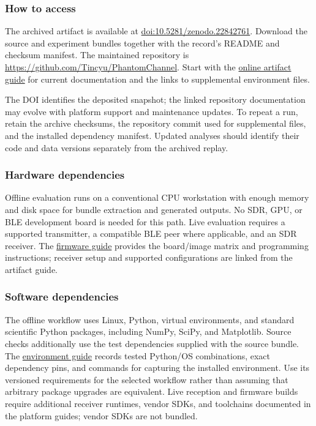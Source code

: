 \documentclass[nonacm,sigconf]{acmart}
\newcommand{\artifactguide}{\href{https://github.com/Tincyu/PhantomChannel/blob/main/docs/artifact-guide.md}{online artifact guide}}
\newcommand{\envguide}{\href{https://github.com/Tincyu/PhantomChannel/blob/main/reproduction/ENVIRONMENT.md}{environment guide}}
\newcommand{\firmwareguide}{\href{https://github.com/Tincyu/PhantomChannel/blob/main/firmware/images/FIRMWARE_GUIDE.md}{firmware guide}}
\begin{document}
\subsubsection{How to access}
The archived artifact is available at
\href{https://doi.org/10.5281/zenodo.22842761}{doi:10.5281/\allowbreak zenodo.22842761}.
Download the source and experiment bundles together with the record's README
and checksum manifest. The maintained repository is
\url{https://github.com/Tincyu/PhantomChannel}.
Start with the \artifactguide{} for current documentation and the links to
supplemental environment files.

The DOI identifies the deposited snapshot; the linked repository documentation
may evolve with platform support and maintenance updates. To repeat a run,
retain the archive checksums, the repository commit used for supplemental
files, and the installed dependency manifest. Updated analyses should identify
their code and data versions separately from the archived replay.

\subsubsection{Hardware dependencies}
Offline evaluation runs on a conventional CPU workstation with enough memory
and disk space for bundle extraction and generated outputs. No SDR, GPU, or
BLE development board is needed for this path. Live evaluation requires a
supported transmitter, a compatible BLE peer where applicable, and an SDR
receiver. The \firmwareguide{} provides the board/image matrix and programming
instructions; receiver setup and supported configurations are linked from the
artifact guide.

\subsubsection{Software dependencies}
The offline workflow uses Linux, Python, virtual environments, and standard
scientific Python packages, including NumPy, SciPy, and Matplotlib. Source
checks additionally use the test dependencies supplied with the source bundle.
The \envguide{} records tested Python/OS combinations, exact dependency pins,
and commands for capturing the installed environment. Use its versioned
requirements for the selected workflow rather than assuming that arbitrary
package upgrades are equivalent. Live reception and firmware builds require
additional receiver runtimes, vendor SDKs, and toolchains documented in the
platform guides; vendor SDKs are not bundled.
\end{document}
